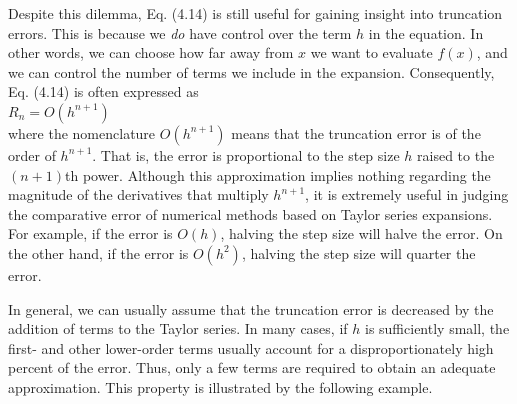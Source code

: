 \documentclass[../main.tex]{subfiles}
\begin{document}
Despite this dilemma, Eq. (4.14) is still useful for gaining insight into truncation
errors. This is because we \emph{do} have control over the term $h$ in the equation. In other words,
we can choose how far away from $x$ we want to evaluate $f (x)$, and we can control the number
of terms we include in the expansion. Consequently, Eq. (4.14) is often expressed as\\

$R_n=O(h^{n+1})$\\

\noindent
where the nomenclature $O(h^{n+1})$ means that the truncation error is of the order of $h^{n+1}$.
That is, the error is proportional to the step size $h$ raised to the $(n + 1)$th power. Although
this approximation implies nothing regarding the magnitude of the derivatives that multiply
$h^{n+1}$, it is extremely useful in judging the comparative error of numerical methods
based on Taylor series expansions. For example, if the error is $O(h)$, halving the step size
will halve the error. On the other hand, if the error is $O(h^2)$, halving the step size will quarter
the error.

In general, we can usually assume that the truncation error is decreased by the addition
of terms to the Taylor series. In many cases, if $h$ is sufficiently small, the first- and other
lower-order terms usually account for a disproportionately high percent of the error. Thus,
only a few terms are required to obtain an adequate approximation. This property is illustrated
by the following example.\\
\end{document}
